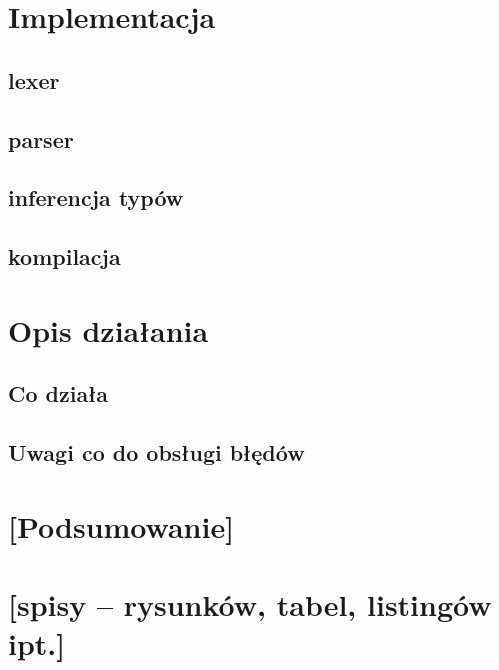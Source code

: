 \documentclass{article}
\begin{document}
\section{Implementacja}
\subsection{lexer}
\subsection{parser}
\subsection{inferencja typów}
\subsection{kompilacja}
\section{Opis działania}
\subsection{Co działa}
\subsection{Uwagi co do obsługi błędów}
\section{[Podsumowanie]}
\section{[spisy -- rysunków, tabel, listingów ipt.]}



\end{document}
